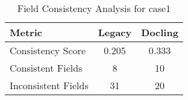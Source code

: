 \begin{table}[h]
\centering
\begin{tabular}{l|cc}
\hline
Metric & Legacy & Docling \\
\hline
Consistency Score & 0.205 & 0.333 \\
Consistent Fields & 8 & 10 \\
Inconsistent Fields & 31 & 20 \\
\hline
\end{tabular}
\caption{Field Consistency Analysis for case1}
\end{table}
